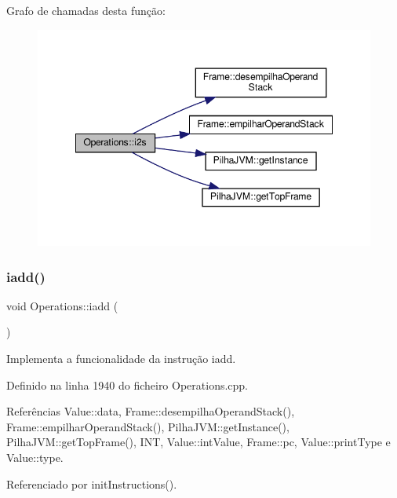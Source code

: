 Grafo de chamadas desta função\+:
\nopagebreak
\begin{figure}[H]
\begin{center}
\leavevmode
\includegraphics[width=348pt]{classOperations_ab83ebb06495a6e42c5edeec05e312f8c_cgraph}
\end{center}
\end{figure}
\mbox{\label{classOperations_a12d5933f0d0c91c578b76edb1971a2be}} 
\subsubsection{\texorpdfstring{iadd()}{iadd()}}
{\footnotesize\ttfamily void Operations\+::iadd (\begin{DoxyParamCaption}{ }\end{DoxyParamCaption})\hspace{0.3cm}{\ttfamily [private]}}



Implementa a funcionalidade da instrução iadd. 



Definido na linha 1940 do ficheiro Operations.\+cpp.



Referências Value\+::data, Frame\+::desempilha\+Operand\+Stack(), Frame\+::empilhar\+Operand\+Stack(), Pilha\+J\+V\+M\+::get\+Instance(), Pilha\+J\+V\+M\+::get\+Top\+Frame(), I\+NT, Value\+::int\+Value, Frame\+::pc, Value\+::print\+Type e Value\+::type.



Referenciado por init\+Instructions().

